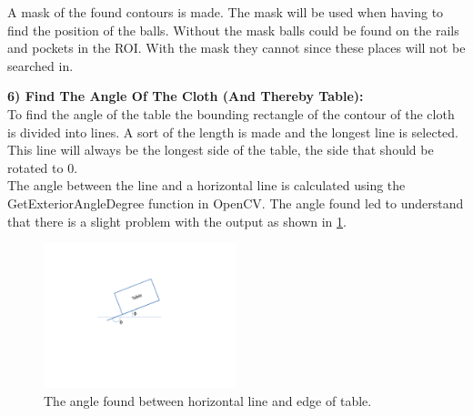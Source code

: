 A mask of the found contours is made. The mask will be used when having to find the position of the balls. Without the mask balls could be found on the rails and pockets in the ROI. With the mask they cannot since these places will not be searched in.

\begin{figure}[H]
\centering
{}
\end{figure}

\textbf{6) Find The Angle Of The Cloth (And Thereby Table):}\\
To find the angle of the table the bounding rectangle of the contour of the cloth is divided into lines. A sort of the length is made and the longest line is selected. This line will always be the longest side of the table, the side that should be rotated to 0\degree. \\

The angle between the line and a horizontal line is calculated using the GetExteriorAngleDegree function in OpenCV. The angle found led to understand that there is a slight problem with the output as shown in \ref{fig:table_angle}.

\begin{figure}[H]
\begin{center}
\leavevmode
\includegraphics[width=0.5\textwidth]{images/table_angle}
\end{center}
\caption{The angle found between horizontal line and edge of table.}
\label{fig:table_angle}
\end{figure}

